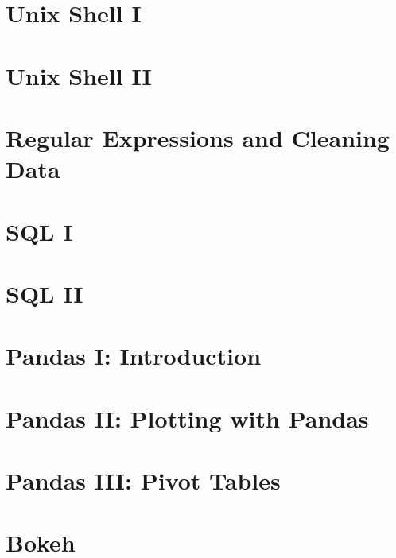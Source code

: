 
\section*{Unix Shell I} %

\section*{Unix Shell II} %

\section*{Regular Expressions and Cleaning Data} %

\section*{SQL I} %

\section*{SQL II} %

\section*{Pandas I: Introduction} %

\section*{Pandas II: Plotting with Pandas} %

\section*{Pandas III: Pivot Tables} %

\section*{Bokeh} %
